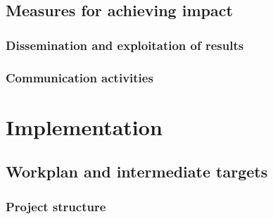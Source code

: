 \documentclass[]{article}
\begin{document}
\hypertarget{measures-for-achieving-impact}{%
\subsection{Measures for achieving
impact}\label{measures-for-achieving-impact}}

\hypertarget{dissemination-and-exploitation-of-results}{%
\subsubsection{Dissemination and exploitation of
results}\label{dissemination-and-exploitation-of-results}}

\hypertarget{communication-activities}{%
\subsubsection{Communication
activities}\label{communication-activities}}

\hypertarget{implementation}{%
\section{Implementation}\label{implementation}}

\hypertarget{workplan-and-intermediate-targets}{%
\subsection{Workplan and intermediate
targets}\label{workplan-and-intermediate-targets}}

\hypertarget{project-structure}{%
\subsubsection{Project structure}\label{project-structure}}
\end{document}

